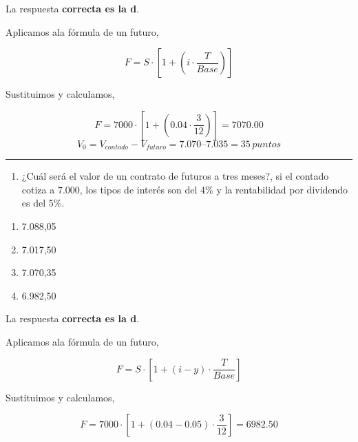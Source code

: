 \documentclass[
  letterpaper,
  DIV=11,
  numbers=noendperiod]{scrreprt}
\providecommand{\tightlist}{%
  \setlength{\itemsep}{0pt}\setlength{\parskip}{0pt}}\usepackage{longtable,booktabs,array}
\begin{document}
\begin{tcolorbox}[enhanced jigsaw, left=2mm, opacityback=0, colback=white, breakable, arc=.35mm, bottomrule=.15mm, rightrule=.15mm, toprule=.15mm, leftrule=.75mm, colframe=quarto-callout-tip-color-frame]
\begin{minipage}[t]{5.5mm}
\textcolor{quarto-callout-tip-color}{\faLightbulb}
\end{minipage}%
\begin{minipage}[t]{\textwidth - 5.5mm}

La respuesta \textbf{correcta es la d}.

Aplicamos ala fórmula de un futuro,

\[F=S\cdot\left[1+(i\cdot\frac{T}{Base})\right]\]

Sustituimos y calculamos,

\[F=7000\cdot\left[1+(0.04\cdot\frac{3}{12})\right]=7070.00\]
\[V_{0}=V_{contado}-V_{futuro}=7.070 – 7.035 = 35 \,puntos\]

\end{minipage}%
\end{tcolorbox}

\begin{center}\rule{0.5\linewidth}{0.5pt}\end{center}

\begin{enumerate}
\def\labelenumi{\arabic{enumi}.}
\setcounter{enumi}{18}
\tightlist
\item
  ¿Cuál será el valor de un contrato de futuros a tres meses?, si el
  contado cotiza a 7.000, los tipos de interés son del 4\% y la
  rentabilidad por dividendo es del 5\%.
\end{enumerate}

\begin{enumerate}
\def\labelenumi{\alph{enumi})}
\item
  7.088,05
\item
  7.017,50
\item
  7.070,35
\item
  6.982,50
\end{enumerate}

\begin{tcolorbox}[enhanced jigsaw, left=2mm, opacityback=0, colback=white, breakable, arc=.35mm, bottomrule=.15mm, rightrule=.15mm, toprule=.15mm, leftrule=.75mm, colframe=quarto-callout-tip-color-frame]
\begin{minipage}[t]{5.5mm}
\textcolor{quarto-callout-tip-color}{\faLightbulb}
\end{minipage}%
\begin{minipage}[t]{\textwidth - 5.5mm}

La respuesta \textbf{correcta es la d}.

Aplicamos ala fórmula de un futuro,

\[F=S\cdot\left[1+(i-y)\cdot\frac{T}{Base}\right]\]

Sustituimos y calculamos,

\[F=7000\cdot\left[1+(0.04-0.05)\cdot\frac{3}{12}\right]=6982.50\]

\end{minipage}%
\end{tcolorbox}
\end{document}
